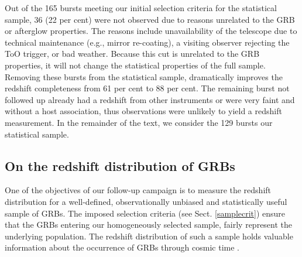 \documentclass[longauth]{aa}    %
\begin{document}
Out of the 165 bursts meeting our initial selection criteria for the statistical
sample, 36 (22 per cent) were not observed due to reasons unrelated to the GRB
or afterglow properties. The reasons include unavailability of the telescope due
to technical maintenance (e.g., mirror re-coating), a visiting observer
rejecting the ToO trigger, or bad weather. Because this cut is unrelated to the
GRB properties, it will not change the statistical properties of the full
sample. Removing these bursts from the statistical sample, dramatically improves
the redshift completeness from 61 per cent to 88 per cent. The remaining burst
not followed up already had a redshift from other instruments or were very faint
and without a host association, thus observations were unlikely to yield a redshift
measurement. In the remainder of the text, we consider the 129 bursts our
statistical sample.

\subsection{On the redshift distribution of GRBs} \label{redshift}

One of the objectives of our follow-up campaign is to measure the redshift
distribution for a well-defined, observationally unbiased and statistically useful
sample of GRBs. The imposed selection criteria (see Sect. \ref{samplecrit})
ensure that the GRBs entering our homogeneously selected sample, fairly represent the
underlying population. The redshift distribution of such a sample holds valuable
information about the occurrence of GRBs through cosmic time
\citep{Jakobsson2012, Perley2016a}.


\end{document}
